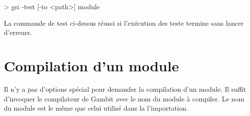 \begin{center}
  \begin{mplisting}{0.8}
> gsi -test [-to <path>] module
\end{mplisting}
\end{center}

La commande de test ci-dessus réussi si l'exécution des teste termine sans
lancer d'erreurs.


\section{Compilation d'un module}
Il n'y a pas d'options spécial pour demander la compilation d'un module.
Il suffit d'invoquer le compilateur de Gambit avec le nom du module
à compiler. Le nom du module est le même que celui utilisé dans la
l'importation.


